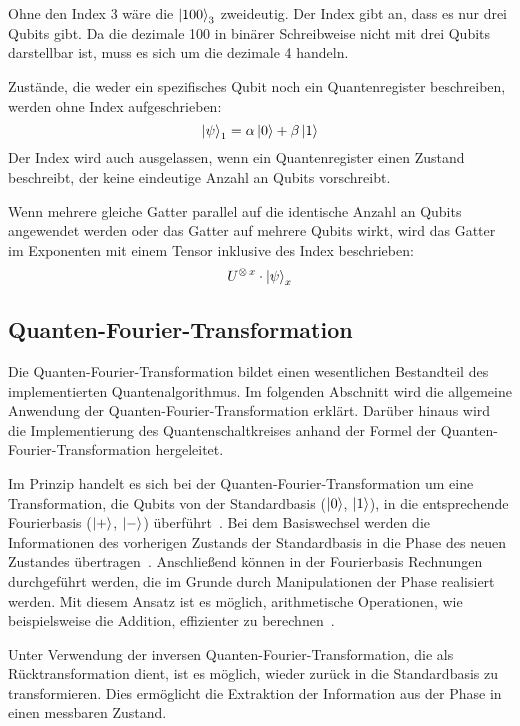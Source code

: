 Ohne den Index 3 wäre die \(\ket{100}_3\) zweideutig. 
Der Index gibt an, dass es nur drei Qubits gibt. 
Da die dezimale 100 in binärer Schreibweise nicht mit drei Qubits darstellbar ist, 
muss es sich um die dezimale 4 handeln.

Zustände, die weder ein spezifisches Qubit noch ein Quantenregister beschreiben, 
werden ohne Index aufgeschrieben:
\[
  \ket{\psi}_1 = \alpha\ket{0} + \beta\ket{1}
  \]
Der Index wird auch ausgelassen, 
wenn ein Quantenregister einen Zustand beschreibt, 
der keine eindeutige Anzahl an Qubits vorschreibt.

\bigskip

Wenn mehrere gleiche Gatter parallel auf die identische Anzahl an Qubits angewendet werden 
oder das Gatter auf mehrere Qubits wirkt, 
wird das Gatter im Exponenten mit einem Tensor inklusive des Index beschrieben:
\[
  U^{\operatorname{\otimes} x} \cdot 
  \ket{\psi}_x
\]


\subsection{Quanten-Fourier-Transformation} \label{Quanten-Fourier-Transformation}
Die Quanten-Fourier-Transformation bildet einen wesentlichen Bestandteil des implementierten Quantenalgorithmus. 
Im folgenden Abschnitt wird die allgemeine Anwendung der Quanten-Fourier-Transformation erklärt.
Darüber hinaus wird die Implementierung des Quantenschaltkreises anhand der Formel der Quanten-Fourier-Transformation hergeleitet.

Im Prinzip handelt es sich bei der Quanten-Fourier-Transformation um eine Transformation,
die Qubits von der Standardbasis (\(\ket{0}\), \(\ket{1}\)),
in die entsprechende Fourierbasis (\(\ket{+}\), \(\ket{-}\)) überführt~\cite[215]{homeister2023quantum215}.
Bei dem Basiswechsel werden die Informationen des vorherigen Zustands der Standardbasis in die Phase des neuen Zustandes übertragen~\cite{Ruiz-Perez2017}.
Anschließend können in der Fourierbasis Rechnungen durchgeführt werden, 
die im Grunde durch Manipulationen der Phase realisiert werden.
Mit diesem Ansatz ist es möglich, arithmetische Operationen, wie beispielsweise 
die Addition, effizienter zu berechnen~\cite{draper2000addition,Ruiz-Perez2017}.

Unter Verwendung der inversen Quanten-Fourier-Transformation, 
die als Rücktransformation dient, ist es möglich, 
wieder zurück in die Standardbasis zu transformieren. 
Dies ermöglicht die Extraktion der Information aus der Phase in einen messbaren Zustand.

